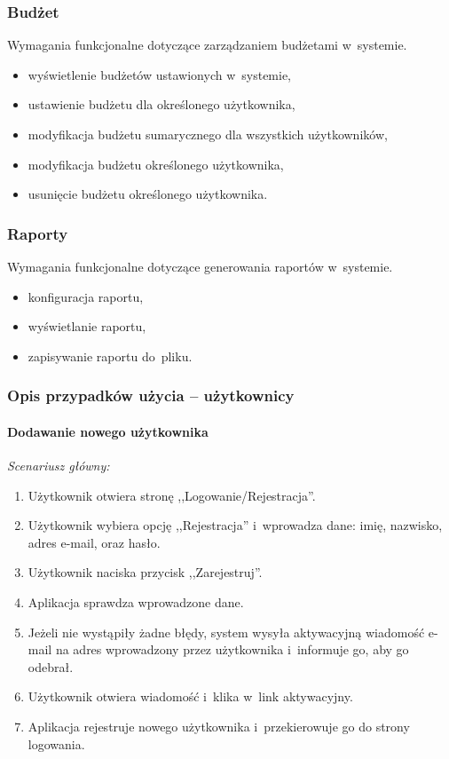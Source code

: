 \subsubsection{Budżet}
Wymagania funkcjonalne dotyczące zarządzaniem budżetami w~systemie.
\begin{itemize}
  \item wyświetlenie budżetów ustawionych w~systemie,
  \item ustawienie budżetu dla określonego użytkownika,
  \item modyfikacja budżetu sumarycznego dla wszystkich użytkowników,
  \item modyfikacja budżetu określonego użytkownika,
  \item usunięcie budżetu określonego użytkownika.
\end{itemize}

\subsubsection{Raporty}
Wymagania funkcjonalne dotyczące generowania raportów w~systemie.
\begin{itemize}
  \item konfiguracja raportu,
  \item wyświetlanie raportu,
  \item zapisywanie raportu do~pliku.
\end{itemize}

\subsubsection{Opis przypadków użycia -- użytkownicy}


\paragraph{Dodawanie nowego użytkownika\newline}
\label{par:register}

\noindent \textit{Scenariusz główny:}
\begin{enumerate}
  \item Użytkownik otwiera stronę ,,Logowanie/Rejestracja''.
  \item Użytkownik wybiera opcję ,,Rejestracja'' i~wprowadza dane: imię, nazwisko, adres e-mail, oraz hasło.
  \item Użytkownik naciska przycisk ,,Zarejestruj''.
  \item Aplikacja sprawdza wprowadzone dane.
  \item Jeżeli nie wystąpiły żadne błędy, system wysyła aktywacyjną wiadomość e-mail na adres wprowadzony przez użytkownika i~informuje go, aby go odebrał.
  \item Użytkownik otwiera wiadomość i~klika w~link aktywacyjny.
  \item Aplikacja rejestruje nowego użytkownika i~przekierowuje go do strony logowania.
\end{enumerate}

